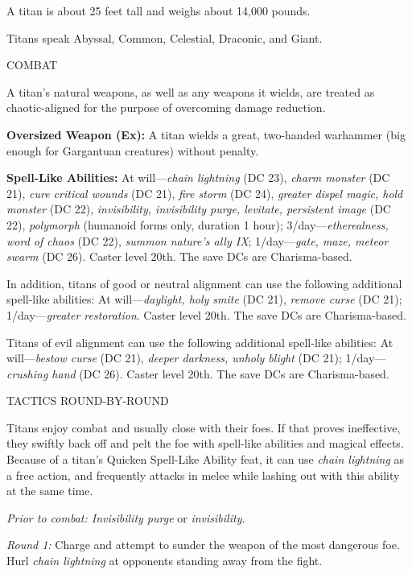 \documentclass{article}
\begin{document}
A titan is about 25 feet tall and weighs about 14,000 pounds. 

Titans speak Abyssal, Common, Celestial, Draconic, and Giant.

COMBAT

A titan's natural weapons, as well as any weapons it wields, are treated as chaotic-aligned 
for the purpose of overcoming damage reduction. 

\textbf{Oversized Weapon (Ex):} A titan wields a great, two-handed warhammer (big 
enough for Gargantuan creatures) without penalty.

\textbf{Spell-Like Abilities: }At will---\textit{chain lightning }(DC 23), \textit{charm 
monster }(DC 21), \textit{cure critical wounds }(DC 21), \textit{fire storm }(DC 
24), \textit{greater dispel magic, hold monster }(DC 22), \textit{invisibility, 
invisibility purge, levitate, persistent image }(DC 22), \textit{polymorph }(humanoid 
forms only, duration 1 hour); 3/day---\textit{etherealness, word of chaos }(DC 
22), \textit{summon nature's ally IX}; 1/day---\textit{gate, maze, meteor swarm 
}(DC 26). Caster level 20th. The save DCs are Charisma-based. 

In addition, titans of good or neutral alignment can use the following additional 
spell-like abilities: At will---\textit{daylight, holy smite }(DC 21), \textit{remove 
curse }(DC 21); 1/day---\textit{greater restoration}. Caster level 20th. The save 
DCs are Charisma-based.

Titans of evil alignment can use the following additional spell-like abilities: 
At will---\textit{bestow curse }(DC 21), \textit{deeper darkness, unholy blight 
}(DC 21); 1/day---\textit{crushing hand }(DC 26). Caster level 20th. The save DCs 
are Charisma-based.

TACTICS ROUND-BY-ROUND

Titans enjoy combat and usually close with their foes. If that proves ineffective, 
they swiftly back off and pelt the foe with spell-like abilities and magical effects. 
Because of a titan's Quicken Spell-Like Ability feat, it can use \textit{chain 
lightning }as a free action, and frequently attacks in melee while lashing out 
with this ability at the same time.

\textit{Prior to combat: Invisibility purge }or \textit{invisibility}.

\textit{Round 1: }Charge and attempt to sunder the weapon of the most dangerous 
foe. Hurl \textit{chain lightning }at opponents standing away from the fight.
\end{document}
